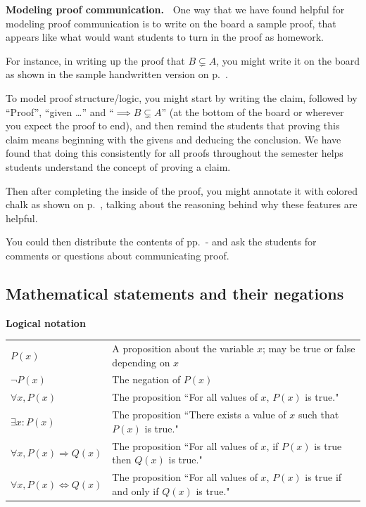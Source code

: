 \documentclass[11pt]{article}
\newenvironment{bignote}[1][Instructor note]%
	{\begin{mdframed}\raggedright{\bf #1.~}}
	{\end{mdframed}}
\theoremstyle{definition}
\begin{document}
\begin{bignote}[Modeling proof communication]
One way that we have found helpful for modeling proof communication is to write on the board a sample proof, that appears like what would want students to turn in the proof as homework. 

For instance, in writing up the proof that $B\subsetneq A$, you might write it on the board as shown in the sample handwritten version on p.~\pageref{s: sample handwritten proof}.  

To model proof structure/logic, you might start by writing the claim, followed by ``Proof'', ``given \dots'' and ``$\implies B\subsetneq A$'' (at the bottom of the board or wherever you expect the proof to end), and then remind the students that proving this claim means beginning with the givens and deducing the conclusion. We have found that doing this consistently for all proofs throughout the semester helps students understand the concept of proving a claim.

Then after completing the inside of the proof, you might annotate it with colored chalk as shown on p.~\pageref{s: good proof communication}, talking about the reasoning behind why these features are helpful.

You could then distribute the contents of pp.~\pageref{s: sample handwritten proof}-\pageref{s: good proof communication} and ask the students for comments or questions about communicating proof.
\end{bignote}

\subsection{Mathematical statements and their negations}
\label{s: statements and negations}

{\bf Logical notation}

\begin{tabular}{L{1in}L{5in}}
$P(x)$ & A proposition about the variable $x$; may be true or false depending on $x$ \\

$\neg P(x)$ & The negation of $P(x)$ \\

$\forall x, P(x)$ & The proposition ``For all values of $x$, $P(x)$ is true." \\

$\exists x: P(x)$ & The proposition ``There exists a value of $x$ such that $P(x)$ is true." \\

$\forall x, P(x) \Rightarrow Q(x)$ & The proposition ``For all values of $x$, if $P(x)$ is true then $Q(x)$ is true."\\

$\forall x, P(x) \Leftrightarrow Q(x)$ & The proposition ``For all values of $x$, $P(x)$ is true if and only if $Q(x)$ is true." 
\end{tabular}
\end{document}
